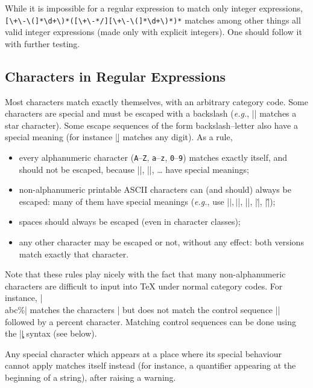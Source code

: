 \documentclass[oneside]{book}
\begin{document}
While it is impossible for a regular expression to match only integer
expressions, \newline\verb*"[\+\-\(]*\d+\)*([\+\-*/][\+\-\(]*\d+\)*)*" matches among
other things all valid integer expressions (made only with explicit
integers).  One should follow it with further testing.

\subsection{Characters in Regular Expressions}

Most characters match exactly themselves,
with an arbitrary category code. Some characters are
special and must be escaped with a backslash (\emph{e.g.}, |\*|
matches a star character). Some escape sequences of
the form backslash--letter also have a special meaning
(for instance |\d| matches any digit). As a rule,
\begin{itemize}
\item every alphanumeric character (\texttt{A}--\texttt{Z},
  \texttt{a}--\texttt{z}, \texttt{0}--\texttt{9}) matches
  exactly itself, and should not be escaped, because
  |\A|, |\B|, \ldots{} have special meanings;
\item non-alphanumeric printable ASCII characters can (and should)
  always be escaped: many of them have special meanings (\emph{e.g.},
  use |\(|, |\)|, |\?|, |\.|, |\^|);
\item spaces should always be escaped (even in character
  classes);
\item any other character may be escaped or not, without any
  effect: both versions match exactly that character.
\end{itemize}
Note that these rules play nicely with the fact that many
non-alphanumeric characters are difficult to input into \TeX{}
under normal category codes. For instance, |\\abc\%|
matches the characters |\abc%
but does not match the control sequence |\abc| followed by a
percent character. Matching control sequences can be done
using the |\c| syntax (see below).

Any special character which appears at a place where its special
behaviour cannot apply matches itself instead (for instance, a
quantifier appearing at the beginning of a string), after raising a
warning.
\end{document}
